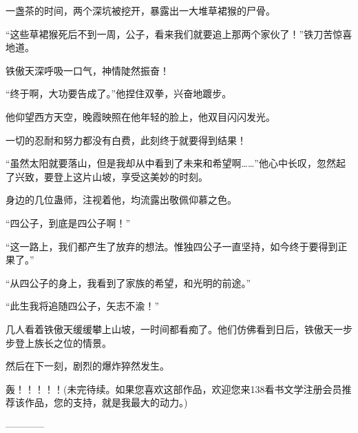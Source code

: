 \begin{this_body}
一盏茶的时间，两个深坑被挖开，暴露出一大堆草裙猴的尸骨。

“这些草裙猴死后不到一周，公子，看来我们就要追上那两个家伙了！”铁刀苦惊喜地道。

铁傲天深呼吸一口气，神情陡然振奋！

“终于啊，大功要告成了。”他捏住双拳，兴奋地踱步。

他仰望西方天空，晚霞映照在他年轻的脸上，他双目闪闪发光。

一切的忍耐和努力都没有白费，此刻终于就要得到结果！

“虽然太阳就要落山，但是我却从中看到了未来和希望啊……”他心中长叹，忽然起了兴致，要登上这片山坡，享受这美妙的时刻。

身边的几位蛊师，注视着他，均流露出敬佩仰慕之色。

“四公子，到底是四公子啊！”

“这一路上，我们都产生了放弃的想法。惟独四公子一直坚持，如今终于要得到正果了。”

“从四公子的身上，我看到了家族的希望，和光明的前途。”

“此生我将追随四公子，矢志不渝！”

几人看着铁傲天缓缓攀上山坡，一时间都看痴了。他们仿佛看到日后，铁傲天一步步登上族长之位的情景。

然后在下一刻，剧烈的爆炸猝然发生。

轰！！！！！(未完待续。如果您喜欢这部作品，欢迎您来138看书文学注册会员推荐该作品，您的支持，就是我最大的动力。)

------------

\end{this_body}

